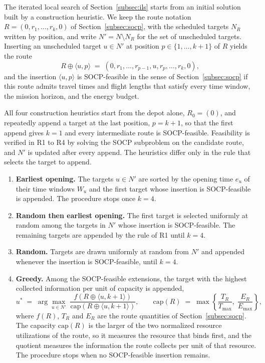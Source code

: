 \documentclass[11pt]{article}
\begin{document}
The iterated local search of Section~\ref{subsec:ils} starts from an initial solution built by a construction heuristic. We keep the route notation $R = (0, r_1, \ldots, r_k, 0)$ of Section~\ref{subsec:socp}, with the scheduled targets $N_R$ written by position, and write $N' = N \setminus N_R$ for the set of unscheduled targets. Inserting an unscheduled target $u \in N'$ at position $p \in \{1, \ldots, k+1\}$ of $R$ yields the route
\[
R \oplus \langle u, p \rangle \;=\; (0, r_1, \ldots, r_{p-1}, u, r_p, \ldots, r_k, 0),
\]
and the insertion $\langle u, p \rangle$ is SOCP-feasible in the sense of Section~\ref{subsec:socp} if this route admits travel times and flight lengths that satisfy every time window, the mission horizon, and the energy budget.

All four construction heuristics start from the depot alone, $R_0 = (0)$, and repeatedly append a target at the last position, $p = k+1$, so that the first append gives $k = 1$ and every intermediate route is SOCP-feasible. Feasibility is verified in R1 to R4 by solving the SOCP subproblem on the candidate route, and $N'$ is updated after every append. The heuristics differ only in the rule that selects the target to append.

\begin{enumerate}[label=\textbf{R\arabic*}., leftmargin=2em]
\item \textbf{Earliest opening.}
The targets $u \in N'$ are sorted by the opening time $e_u$ of their time windows $W_u$ and the first target whose insertion is SOCP-feasible is appended. The procedure stops once $k = 4$.

\item \textbf{Random then earliest opening.}
The first target is selected uniformly at random among the targets in $N'$ whose insertion is SOCP-feasible. The remaining targets are appended by the rule of R1 until $k = 4$.

\item \textbf{Random.}
Targets are drawn uniformly at random from $N'$ and appended whenever the insertion is SOCP-feasible, until $k = 4$.

\item \textbf{Greedy.}
Among the SOCP-feasible extensions, the target with the highest collected information per unit of capacity is appended,
\begin{equation}\label{eq:r4-ratio}
u^{*} \;=\; \arg\max_{u \in N'} \; \frac{f(R \oplus \langle u, k+1 \rangle)}{\mathrm{cap}(R \oplus \langle u, k+1 \rangle)},
\qquad
\mathrm{cap}(R) \;=\; \max\!\left\{ \frac{T_R}{T_{\max}},\; \frac{E_R}{E_{\max}} \right\},
\end{equation}
where $f(R)$, $T_R$ and $E_R$ are the route quantities of Section~\ref{subsec:socp}. The capacity $\mathrm{cap}(R)$ is the larger of the two normalized resource utilizations of the route, so it measures the resource that binds first, and the quotient measures the information the route collects per unit of that resource. The procedure stops when no SOCP-feasible insertion remains.
\end{enumerate}
\end{document}
